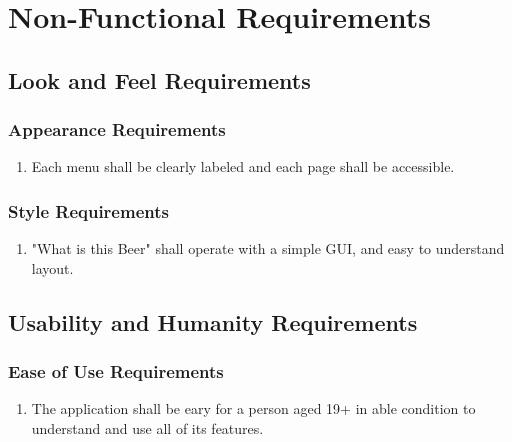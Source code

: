 \documentclass[]{article}
\begin{document}
\section{Non-Functional Requirements}
\label{sec:non-functional_requirements}
\subsection{Look and Feel Requirements}
\label{sub:look_and_feel_requirements}

\subsubsection{Appearance Requirements}
\label{ssub:appearance_requirements}
\begin{enumerate}[{LF}1. ]
	\item Each menu shall be clearly labeled and each page shall be accessible.
\end{enumerate}

\subsubsection{Style Requirements}
\label{ssub:style_requirements}
\begin{enumerate}[{LF}1. ]
	\item "What is this Beer" shall operate with a simple GUI, and easy to understand layout.
\end{enumerate}


\subsection{Usability and Humanity Requirements}
\label{sub:usability_and_humanity_requirements}

\subsubsection{Ease of Use Requirements}
\label{ssub:ease_of_use_requirements}
\begin{enumerate}[{UH}1. ]
	\item The application shall be eary for a person aged 19+ in able condition to understand and use all of its features.
\end{enumerate}
\end{document}
